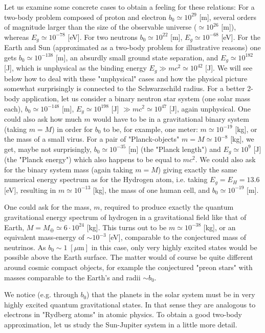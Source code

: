 	Let us examine some concrete cases to obtain a feeling for these relations: For a two-body problem composed of proton and electron $b_0 \simeq 10^{29}$ [m], several orders of magnitude larger than the size of the observable universe ($\simeq 10^{26}$ [m]), whereas $E_g \simeq 10^{-78}$ [eV]. For two neutrons $b_0 \simeq 10^{22}$ [m], $E_g \simeq 10^{-68}$ [eV]. For the Earth and Sun (approximated as a two-body problem for illustrative reasons) one gets $b_0 \simeq 10^{-138}$ [m], an absurdly small ground state separation, and $E_g	\simeq 10^{182}$ [J], which is unphysical as the binding energy $E_g \gg mc^2 \simeq 10^{42}$ [J]. We will see below how to deal with	these "unphysical" cases and how the physical picture somewhat surprisingly is connected to the Schwarzschild radius. For a better 2-body application, let us consider a binary neutron star system (one solar mass each), $b_0 \simeq 10^{-148}$ [m], $E_g	\simeq 10^{198}$ [J] $\gg mc^2 \simeq 10^{47}$ [J], again unphysical. One could also ask how much $m$ would have to be in a gravitational binary system (taking $m = M$) in order for $b_0$ to be, for example, one meter: $m \simeq 10^{-19}$ [kg], or the mass of a small virus. For a pair of "Planck-objects" $m = M \simeq	10^{-8}$ [kg], we get, maybe not surprisingly, $b_0 \simeq 10^{-35}$ [m] (the "Planck length") and $E_g \simeq 10^{9}$ [J] (the "Planck energy") which also happens to be equal to $mc^2$. We could also ask for the binary system mass (again taking $m=M$) giving exactly the same numerical energy spectrum as for the Hydrogen atom, i.e. taking $E_g = E_H = 13.6$ [eV], resulting in $m \simeq 10^{-13}$ [kg], the mass of one human cell, and $b_0 \simeq 10^{-19}$ [m].
	
	One could ask for the mass, $m$, required to produce exactly the quantum gravitational energy spectrum of hydrogen in a 	gravitational field like that of Earth, $M = M_{\oplus} \simeq 6 \cdot 10^{24}$ [kg]. This turns out to be $m \simeq 10^{-38}$ [kg], or an equivalent mass-energy of $\sim 10^{-3}$ [eV], comparable to the conjectured mass of neutrinos. As $b_0 \sim 1\;[\mu\text{m}]$ in this case, only very highly excited states would be possible above the 	Earth surface. The matter would of course be quite different around cosmic compact objects, for example the conjectured "preon stars" with masses comparable to the Earth's and radii $\sim b_0$.
	
	We notice (e.g. through $b_0$) that the planets in the solar system must be in very highly excited quantum gravitational states. In that sense they are analogous to electrons in "Rydberg atoms" in atomic physics. To obtain a good two-body approximation, let us study the Sun-Jupiter system in a little more detail.
	
